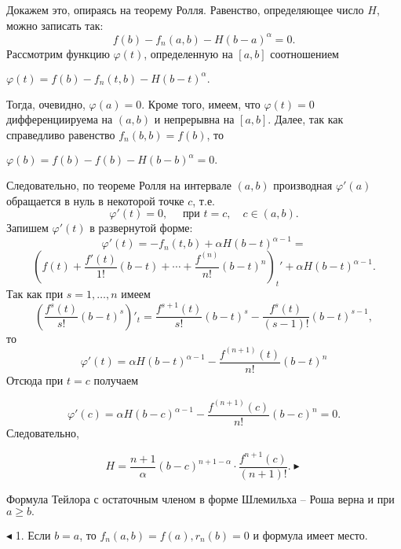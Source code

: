 Докажем это, опираясь на теорему Ролля. Равенство, определяющее число $H$, можно записать так:
$$f(b)-f_{n}(a,b)-H(b-a)^{\alpha}=0.$$
Рассмотрим функцию $\varphi(t)$, определенную на $[a,b]$ соотношением \\
\centerline{$\varphi(t)=f(b)-f_{n}(t,b)-H(b-t)^{\alpha}.$}
Тогда, очевидно, $\varphi(a)=0$. Кроме того, имеем, что $\varphi(t)=0$ дифференциируема на $(a,b)$ и непрерывна на $[a,b]$. Далее, так как справедливо равенство $f_{n}(b,b)=f(b)$, то

\centerline{$\varphi(b)=f(b)-f(b)-H(b-b)^{\alpha}=0.$}
Следовательно, по теореме Ролля на интервале $(a,b)$ производная $\varphi'(a)$ обращается в нуль в некоторой точке $c$, т.е.
$$\varphi'(t)=0,\quad \text{ при } t=c,\quad c\in(a,b).$$
Запишем $\varphi'(t)$ в развернутой форме:
$$\varphi'(t)= -f_{n}(t,b)+\alpha H(b-t)^{\alpha - 1}=$$
$$\left(f(t)+\dfrac{f'(t)}{1!}(b-t)+ \cdots + \dfrac{f^{(n)}}{n!}{(b-t)}^{n} \right)_{t}' + \alpha H(b-t)^{\alpha-1}.$$
Так как при $s=1, \ldots ,n$ имеем
$$\left(\dfrac{f^{s}(t)}{s!}(b-t)^s \right)'_{t} = \dfrac{f^{s+1}(t)}{s!}(b-t)^s - \dfrac{f^{s}(t)}{(s-1)!}(b-t)^{s-1},$$
то
$$\varphi'(t)= \alpha H(b-t)^{\alpha-1} - \dfrac{f^{(n+1)}(t)}{n!}(b-t)^{n}$$ 
Отсюда при $t=c$ получаем 

$$\varphi'(c)= \alpha H(b-c)^{\alpha-1} - \dfrac{f^{(n+1)}(c)}{n!}(b-c)^{n}=0.$$
Следовательно,

$$H = \dfrac{n+1}{\alpha}(b-c)^{n+1- \alpha} \cdot \dfrac{f^{n+1}(c)}{(n+1)!}. \blacktriangleright$$
\begin{sledstvie} Формула Тейлора с остаточным членом в форме Шлемильха -- Роша верна и при $a \ge b.$
\end{sledstvie}
$\blacktriangleleft$ 1. Если $b=a$, то $f_{n}(a,b)=f(a), r_{n}(b)=0$ и формула имеет место.

